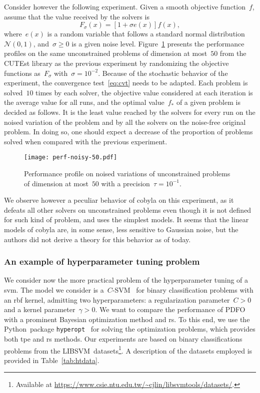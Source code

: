 \documentclass[11pt,draft]{article}
\numberwithin{equation}{section}
\newcommand{\obj}{f}
\def\libsvm{\mbox{LIBSVM}}
\def\python{\mbox{Python}}
\begin{document}
Consider however the following experiment.
Given a smooth objective function~$\obj$, assume that the value received by the solvers is
$$F_{\sigma}(x) = [1 + \sigma e(x)] \obj(x),$$
where~$e(x)$ is a random variable that follows a standard normal distribution~$\mathcal{N}(0, 1)$, and~$\sigma \ge 0$ is a given noise level.
Figure~\ref{fig:ppun-50} presents the performance profiles on the same unconstrained problems of dimension at most~$50$ from the CUTEst library as the previous experiment by randomizing the objective functions as~$F_{\sigma}$ with~$\sigma = 10^{-2}$.
Because of the stochastic behavior of the experiment, the convergence test~\eqref{eq:cvt} needs to be adapted.
Each problem is solved~$10$ times by each solver, the objective value considered at each iteration is the average value for all runs, and the optimal value~$f_{\ast}$ of a given problem is decided as follows.
It is the least value reached by the solvers for every run on the noised variation of the problem and by all the solvers on the noise-free original problem.
In doing so, one should expect a decrease of the proportion of problems solved when compared with the previous experiment.

\begin{figure}[ht]
    \centering
    \texttt{[image: perf-noisy-50.pdf]}
    \caption{Performance profile on noised variations of unconstrained problems of dimension at most~$50$ with a precision~$\tau = 10^{-1}$.}
    \label{fig:ppun-50}
\end{figure}

We observe however a peculiar behavior of \gls{cobyla} on this experiment, as it defeats all other solvers on unconstrained problems even though it is not defined for such kind of problem, and uses the simplest models.
It seems that the linear models of \gls{cobyla} are, in some sense, less sensitive to Gaussian noise, but the authors did not derive a theory for this behavior as of today.

\subsubsection{An example of hyperparameter tuning problem}

We consider now the more practical problem of the hyperparameter tuning of a \gls{svm}.
The model we consider is a~$C$-SVM~\cite{Chang_Lin_2011} for binary classification problems with an \gls{rbf} kernel, admitting two hyperparameters: a regularization parameter~$C > 0$ and a kernel parameter~$\gamma > 0$.
We want to compare the performance of PDFO with a prominent Bayesian optimization method and \gls{rs}.
To this end, we use the \python\ package \texttt{hyperopt}~\cite{Bergstra_Yamins_Cox_2013} for solving the optimization problems, which provides both \gls{tpe} and \gls{rs} methods.
Our experiments are based on binary classifications problems from the \libsvm\ datasets\footnote{Available at \url{https://www.csie.ntu.edu.tw/~cjlin/libsvmtools/datasets/}.}.
A description of the datasets employed is provided in Table~\ref{tab:htdata}.
\end{document}
